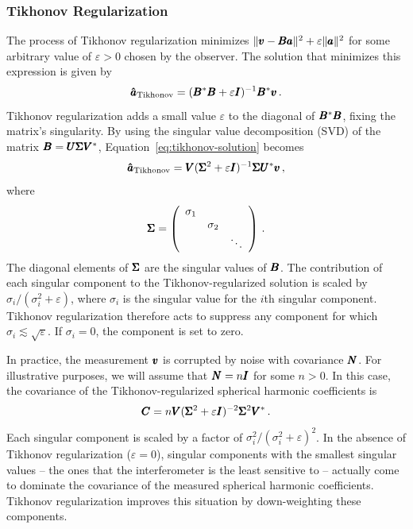 \begin{bibunit}
\subsubsection{Tikhonov Regularization}

The process of Tikhonov regularization minimizes $\|\pmb v - \pmb B\pmb a\|^2 + \varepsilon\|\pmb a\|^2$ for
some arbitrary value of $\varepsilon > 0$ chosen by the observer. The solution that minimizes this
expression is given by
\begin{equation}\label{eq:tikhonov-solution}
    \pmb{\hat a}_\text{Tikhonov} = (\pmb B^*\pmb B + \varepsilon\pmb I)^{-1}\pmb B^*\pmb v\,.
\end{equation}
Tikhonov regularization adds a small value $\varepsilon$ to the diagonal of $\pmb B^*\pmb B$, fixing the
matrix's singularity. By using the singular value decomposition (SVD) of the matrix $\pmb B = \pmb U \pmb
\Sigma \pmb V^*$, Equation~\ref{eq:tikhonov-solution} becomes
\begin{equation}
    \pmb{\hat a}_\text{Tikhonov} = \pmb V (\pmb\Sigma^2 + \varepsilon \pmb I)^{-1}\pmb\Sigma \pmb U^*\pmb v\,,
\end{equation}
where
\[
    \pmb\Sigma = \left(
        \begin{array}{ccc}
            \sigma_1 & & \\
                     & \sigma_2 & \\
                     & & \ddots \\
        \end{array}
    \right)\,.
\]
The diagonal elements of $\pmb\Sigma$ are the singular values of $\pmb B$. The contribution of each
singular component to the Tikhonov-regularized solution is scaled by $\sigma_i / (\sigma_i^2 +
\varepsilon)$, where $\sigma_i$ is the singular value for the $i$th singular component. Tikhonov
regularization therefore acts to suppress any component for which
$\sigma_i\lesssim\sqrt{\varepsilon}$.  If $\sigma_i = 0$, the component is set to zero.

In practice, the measurement $\pmb v$ is corrupted by noise with covariance $\pmb N$. For illustrative
purposes, we will assume that $\pmb N=n\pmb I$ for some $n>0$. In this case, the covariance of the
Tikhonov-regularized spherical harmonic coefficients is
\begin{equation}
    \pmb C = n \pmb V (\pmb\Sigma^2 + \varepsilon\pmb I)^{-2} \pmb\Sigma^2 \pmb V^*\,.
\end{equation}
Each singular component is scaled by a factor of $\sigma_i^2/(\sigma_i^2 + \varepsilon)^2$.  In the
absence of Tikhonov regularization ($\varepsilon=0$), singular components with the smallest singular
values -- the ones that the interferometer is the least sensitive to -- actually come to dominate
the covariance of the measured spherical harmonic coefficients. Tikhonov regularization improves
this situation by down-weighting these components.


\end{bibunit}
